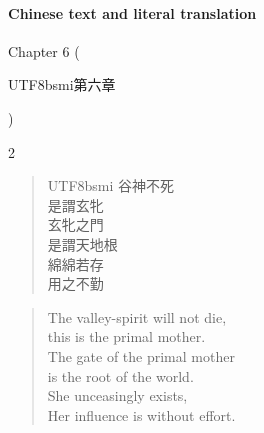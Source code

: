 \paragraph{Chinese text and literal translation}


Chapter 6 (\begin{CJK*}{UTF8}{bsmi}第六章\end{CJK*})

\begin{paracol}{2}
\begin{verse}
\begin{CJK*}{UTF8}{bsmi}
谷神不死\\
是謂玄牝\\
玄牝之門\\
是謂天地根\\
綿綿若存\\
用之不勤
\end{CJK*}
\end{verse}
\switchcolumn
\begin{verse}
The valley-spirit will not die,\\
this is the primal mother.\\
The gate of the primal mother\\
is the root of the world.\\
She unceasingly exists,\\
Her influence is without effort.
\end{verse}
\end{paracol}



